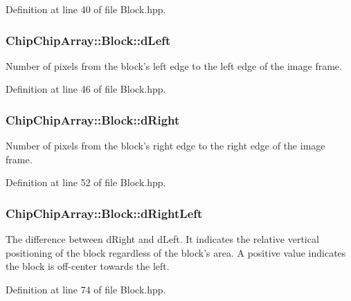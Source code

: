 Definition at line 40 of file Block.\+hpp.

\hypertarget{classChipChipArray_1_1Block_aca89dc06d62feb9a6478a06976171b2b}{
\subsubsection[{d\+Left}]{ Chip\+Chip\+Array\+::\+Block\+::d\+Left}}\label{classChipChipArray_1_1Block_aca89dc06d62feb9a6478a06976171b2b}
Number of pixels from the block's left edge to the left edge of the image frame. 

Definition at line 46 of file Block.\+hpp.

\hypertarget{classChipChipArray_1_1Block_a6a4b0aa6aae7e41d836c8955e209c16e}{
\subsubsection[{d\+Right}]{ Chip\+Chip\+Array\+::\+Block\+::d\+Right}}\label{classChipChipArray_1_1Block_a6a4b0aa6aae7e41d836c8955e209c16e}
Number of pixels from the block's right edge to the right edge of the image frame. 

Definition at line 52 of file Block.\+hpp.

\hypertarget{classChipChipArray_1_1Block_a2d02c7b99ca656960fc9724587791999}{
\subsubsection[{d\+Right\+Left}]{ Chip\+Chip\+Array\+::\+Block\+::d\+Right\+Left}}\label{classChipChipArray_1_1Block_a2d02c7b99ca656960fc9724587791999}
The difference between d\+Right and d\+Left. It indicates the relative vertical positioning of the block regardless of the block's area. A positive value indicates the block is off-\/center towards the left. 

Definition at line 74 of file Block.\+hpp.

